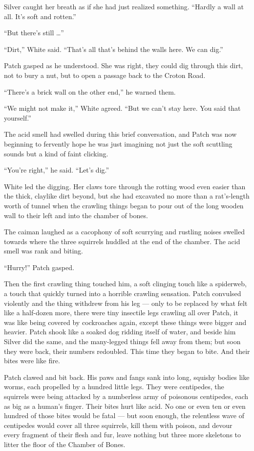 \documentclass[12pt]{memoir}
\begin{document}
Silver caught her breath as if she had just realized
something. “Hardly a wall at all. It’s soft and rotten.”

“But there’s still …”

“Dirt,” White said. “That’s all that’s behind the walls here. We can
dig.”

Patch gasped as he understood. She was right, they could dig through
this dirt, not to bury a nut, but to open a passage back to the Croton
Road.

“There’s a brick wall on the other end,” he warned them.

“We might not make it,” White agreed. “But we can’t stay here. You
said that yourself.”

The acid smell had swelled during this brief conversation, and Patch
was now beginning to fervently hope he was just imagining not just the
soft scuttling sounds but a kind of faint clicking.

“You’re right,” he said. “Let’s dig.”

White led the digging. Her claws tore through the rotting wood even
easier than the thick, claylike dirt beyond, but she had excavated no
more than a rat’s-length worth of tunnel when the crawling things
began to pour out of the long wooden wall to their left and into the
chamber of bones.

The caiman laughed as a cacophony of soft scurrying and rustling
noises swelled towards where the three squirrels huddled at the end of
the chamber. The acid smell was rank and biting.

“Hurry!” Patch gasped.

Then the first crawling thing touched him, a soft clinging touch like
a spiderweb, a touch that quickly turned into a horrible crawling
sensation. Patch convulsed violently and the thing withdrew from his
leg — only to be replaced by what felt like a half-dozen more, there
were tiny insectile legs crawling all over Patch, it was like being
covered by cockroaches again, except these things were bigger and
heavier. Patch shook like a soaked dog ridding itself of water, and
beside him Silver did the same, and the many-legged things fell away
from them; but soon they were back, their numbers redoubled. This time
they began to bite. And their bites were like fire.

Patch clawed and bit back. His paws and fangs sank into long, squishy
bodies like worms, each propelled by a hundred little legs. They were
centipedes, the squirrels were being attacked by a numberless army of
poisonous centipedes, each as big as a human’s finger. Their bites
hurt like acid. No one or even ten or even hundred of those bites
would be fatal — but soon enough, the relentless wave of centipedes
would cover all three squirrels, kill them with poison, and devour
every fragment of their flesh and fur, leave nothing but three more
skeletons to litter the floor of the Chamber of Bones.
\end{document}

